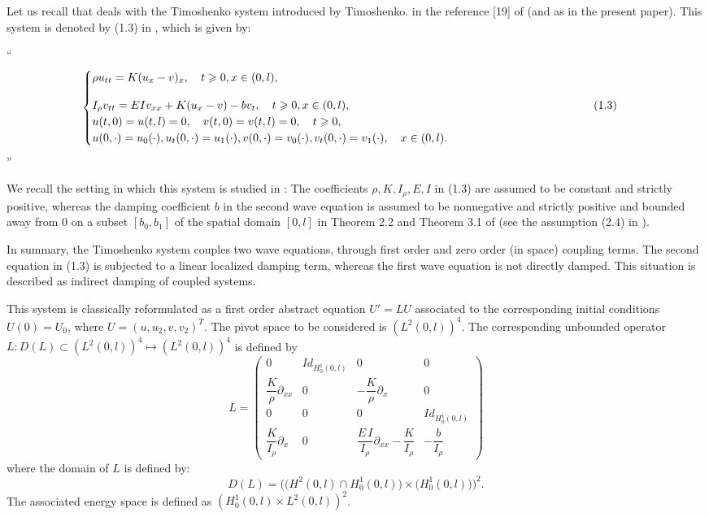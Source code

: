 \documentclass[10pt, english]{article}
\begin{document}
Let us recall that \cite{SW2003} deals with the Timoshenko system introduced by Timoshenko. in the reference [19] of \cite{SW2003} (and as \cite{T1921} in the present paper). This system is denoted by (1.3) in \cite{SW2003}, which is given by:

\enquote{
\begin{equation*}\label{C4.55}%
\begin{cases}
\rho u_{tt}=K(u_{x}-v)_{x},  \quad t\geqslant 0, x \in (0,l), \\[1em]
I_{\rho }v_{tt}=EI v_{xx}+K(u_{x}-v) - bv_{t}, \quad t\geqslant 0, x \in (0,l), \hspace{7.5cm}   (1.3)\\
u(t,0)=u(t,l)=0,\quad v(t,0)=v(t,l)=0, \quad t \geqslant 0,\\
u(0,\cdot)=u_0(\cdot),u_t(0,\cdot)=u_1(\cdot), v(0,\cdot)=v_0(\cdot),v_t(0,\cdot)=v_1(\cdot), \quad x \in (0,l).
\end{cases} 
\end{equation*}
}

We recall the setting in which this system is studied in \cite{SW2003}: The coefficients $ \rho, K, I_{\rho}, E, I$ in (1.3) are assumed to be constant and strictly positive, whereas the damping coefficient $b$ in the second wave equation is assumed to be nonnegative and strictly positive  and bounded away from $0$ on a subset $[b_0,b_1]$  of the spatial domain $[0,l]$ in Theorem 2.2 and Theorem 3.1 of \cite{SW2003} (see the assumption (2.4) in \cite{SW2003}).

 In summary,  the Timoshenko system couples two wave equations, through first order and zero order (in space) coupling terms. The second equation in (1.3) is subjected to a linear localized damping term, whereas the first  wave equation is not directly damped. This situation is described as indirect damping of coupled systems.
  
This system is classically reformulated as a first order abstract equation $U'=LU$ associated to the corresponding initial conditions $U(0)=U_0$, where $U=(u,u_2,v,v_2)^T$. The pivot space to be considered is $(L^2(0,l))^4$.
The corresponding unbounded operator $L: D(L) \subset (L^2(0,l))^4 \mapsto (L^2(0,l))^4$ is defined by
\begin{equation}\label{C4.56}%
L=\begin{pmatrix}
0 & Id_{H^1_0(0,l)} & 0 & 0 \\
\dfrac{K}{\rho} \partial_{xx} & 0 & - \dfrac{K}{\rho} \partial_{x} & 0 \\
0 & 0 & 0 & Id_{H^1_0(0,l)} \\
\dfrac{K}{I_{\rho} }\partial_{x} & 0 & \dfrac{E\,I}{I_{\rho} }\partial_{xx} - \dfrac{K}{I_{\rho}} & - \dfrac{b}{I_{\rho}}
\end{pmatrix}
\end{equation}
 where the domain of $L$ is defined by:
\begin{equation}\label{C4.57}%
D(L)=\Big(\big(H^2(0,l)\cap H^1_0(0,l))\times \big(H^1_0(0,l)\big)\Big)^2.
\end{equation}
The associated energy space is defined as $(H^1_0(0,l)\times L^2(0,l))^2$.
\end{document}
